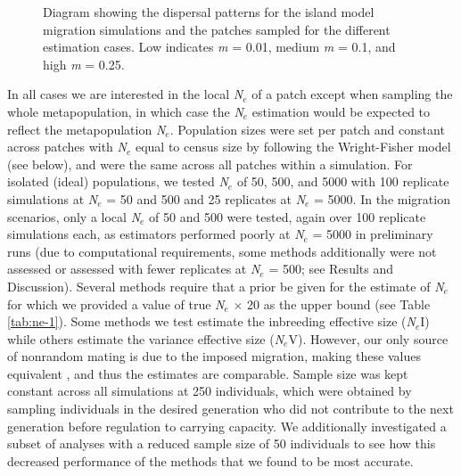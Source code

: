 \begin{figure}[]
\centering
{}
\caption{Diagram showing the dispersal patterns for the island model migration simulations and the patches 
sampled for the different estimation cases. Low indicates \emph{m} = 0.01, medium \emph{m} = 0.1, and high \emph{m} = 0.25.}
\label{fig:ne-1}
\end{figure}

In all cases we are interested in the local \emph{N}$_e$ of a patch except when sampling 
the whole metapopulation, in which case the \emph{N}$_e$ estimation would be expected to 
reflect the metapopulation \emph{N}$_e$. Population sizes were set per patch and constant 
across patches with \emph{N}$_e$ equal to census size by following the Wright-Fisher model 
(see below), and were the same across all patches within a simulation. For isolated (ideal) 
populations, we tested \emph{N}$_e$ of 50, 500, and 5000 with 100 replicate simulations at 
\emph{N}$_e$ = 50 and 500 and 25 replicates at \emph{N}$_e$ = 5000. In the migration scenarios, 
only a local \emph{N}$_e$ of 50 and 500 were tested, again over 100 replicate simulations each, 
as estimators performed poorly at \emph{N}$_e$ = 5000 in preliminary runs (due to computational 
requirements, some methods additionally were not assessed or assessed with fewer replicates at 
\emph{N}$_e$ = 500; see Results and Discussion). Several methods require that a prior be given 
for the estimate of \emph{N}$_e$ for which we provided a value of true \emph{N}$_e$ $\times$ 20 as 
the upper bound (see Table \ref{tab:ne-1}). Some methods we test estimate the inbreeding effective size 
(\emph{N}$_e$I) while others estimate the variance effective size (\emph{N}$_e$V). However, 
our only source of nonrandom mating is due to the imposed migration, making these values 
equivalent \citep{Hill:1979}, and thus the estimates are comparable. Sample size was kept constant 
across all simulations at 250 individuals, which were obtained by sampling individuals in the 
desired generation who did not contribute to the next generation before regulation to carrying 
capacity. We additionally investigated a subset of analyses with a reduced sample size of 50 
individuals to see how this decreased performance of the methods that we found to be most accurate.

